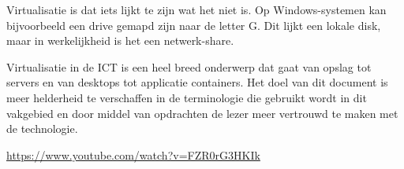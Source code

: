 Virtualisatie is dat iets lijkt te zijn wat het niet is. Op Windows-systemen kan bijvoorbeeld een drive gemapd zijn naar de letter G. Dit lijkt een lokale disk, maar in werkelijkheid is het een netwerk-share.

Virtualisatie in de ICT is een heel breed onderwerp dat gaat van opslag tot servers en van desktops tot applicatie containers. Het doel van  dit document is meer helderheid te verschaffen in de terminologie die gebruikt wordt in dit vakgebied en door middel van opdrachten de lezer meer vertrouwd te maken met de technologie.

\url{https://www.youtube.com/watch?v=FZR0rG3HKIk}
